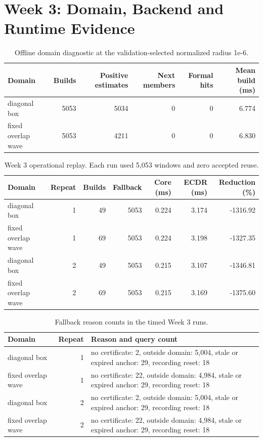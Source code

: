 \section{Week 3: Domain, Backend and Runtime Evidence}
\begin{table}[H]
\caption{Offline domain diagnostic at the validation-selected normalized radius 1e-6.}
\centering\small
\begin{tabularx}{\textwidth}{@{}Yrrrrr@{}}\toprule
Domain & Builds & Positive estimates & Next members & Formal hits & Mean build (ms)\\
\midrule
diagonal box & 5053 & 5034 & 0 & 0 & 6.774\\
fixed overlap wave & 5053 & 4211 & 0 & 0 & 6.830\\
\bottomrule\end{tabularx}
\end{table}
\begin{table}[H]
\caption{Week 3 operational replay. Each run used 5,053 windows and zero accepted reuse.}
\centering\small
\begin{tabularx}{\textwidth}{@{}Yrrrrrr@{}}\toprule
Domain & Repeat & Builds & Fallback & Core (ms) & ECDR (ms) & Reduction (\%)\\
\midrule
diagonal box & 1 & 49 & 5053 & 0.224 & 3.174 & -1316.92\\
fixed overlap wave & 1 & 69 & 5053 & 0.224 & 3.198 & -1327.35\\
diagonal box & 2 & 49 & 5053 & 0.215 & 3.107 & -1346.81\\
fixed overlap wave & 2 & 69 & 5053 & 0.215 & 3.169 & -1375.60\\
\bottomrule\end{tabularx}
\end{table}
\begin{table}[H]
\caption{Fallback reason counts in the timed Week 3 runs.}
\centering\small
\begin{tabularx}{\textwidth}{@{}YrY@{}}\toprule
Domain & Repeat & Reason and query count\\
\midrule
diagonal box & 1 & no certificate: 2, outside domain: 5,004, stale or expired anchor: 29, recording reset: 18\\
fixed overlap wave & 1 & no certificate: 22, outside domain: 4,984, stale or expired anchor: 29, recording reset: 18\\
diagonal box & 2 & no certificate: 2, outside domain: 5,004, stale or expired anchor: 29, recording reset: 18\\
fixed overlap wave & 2 & no certificate: 22, outside domain: 4,984, stale or expired anchor: 29, recording reset: 18\\
\bottomrule\end{tabularx}
\end{table}
